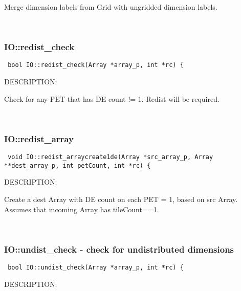         Merge dimension labels from Grid with ungridded dimension labels.
   
 
\mbox{}\hrulefill\ 
 
\subsubsection [IO::redist\_check] {IO::redist\_check}


  
\begin{verbatim} bool IO::redist_check(Array *array_p, int *rc) {\end{verbatim}
{\sf DESCRIPTION:\\ }


        Check for any PET that has DE count != 1.  Redist will be required.
   
 
\mbox{}\hrulefill\ 
 
\subsubsection [IO::redist\_array] {IO::redist\_array}


  
\begin{verbatim} void IO::redist_arraycreate1de(Array *src_array_p, Array **dest_array_p, int petCount, int *rc) {\end{verbatim}
{\sf DESCRIPTION:\\ }


        Create a dest Array with DE count on each PET = 1, based on src Array.
        Assumes that incoming Array has tileCount==1.
   
 
\mbox{}\hrulefill\ 
 
\subsubsection [IO::undist\_check] {IO::undist\_check - check for undistributed dimensions}


  
\begin{verbatim} bool IO::undist_check(Array *array_p, int *rc) {\end{verbatim}
{\sf DESCRIPTION:\\ }


